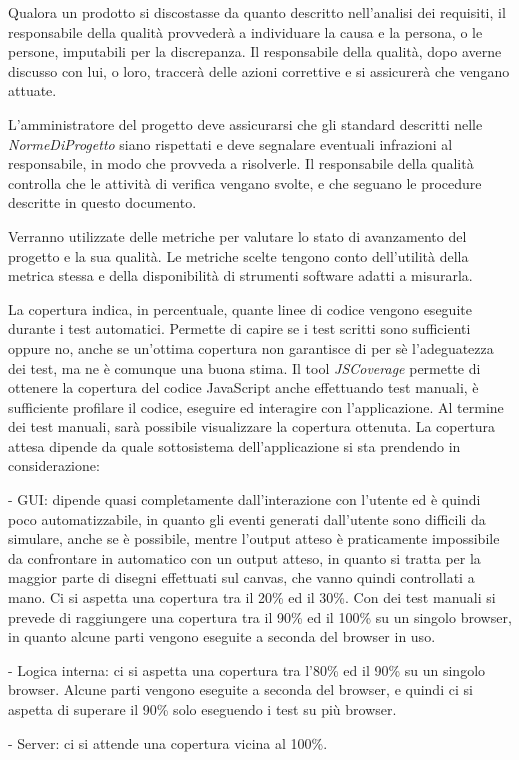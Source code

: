 Qualora un prodotto si discostasse da quanto descritto nell'analisi dei requisiti, il responsabile della qualit\`a provveder\`a a individuare la causa e la persona, o le persone, imputabili per la discrepanza. Il responsabile della qualit\`a, dopo averne discusso con lui, o loro, traccer\`a delle azioni correttive e si assicurer\`a che vengano attuate.
 
L'amministratore del progetto deve assicurarsi che gli standard descritti nelle \textit{NormeDiProgetto} siano rispettati e deve segnalare eventuali infrazioni al responsabile, in modo che provveda a risolverle. Il responsabile della qualit\`a controlla che le attivit\`a di verifica vengano svolte, e che seguano le procedure descritte in questo documento.
\newpage
 

Verranno utilizzate delle metriche per valutare lo stato di avanzamento del progetto e la sua qualit\`a. 
Le metriche scelte tengono conto dell'utilit\`a della metrica stessa e della disponibilit\`a di strumenti software
adatti a misurarla.

La copertura indica, in percentuale, quante linee di codice vengono eseguite durante i test automatici. Permette di capire se i test scritti sono sufficienti oppure no, anche se un'ottima copertura non garantisce di per s\`e l'adeguatezza dei test, ma ne \`e comunque una buona stima. Il tool \textit{JSCoverage} permette di ottenere la copertura del codice JavaScript anche effettuando test manuali, \`e sufficiente profilare il codice, eseguire ed interagire con l'applicazione. Al termine dei test manuali, sar\`a possibile visualizzare la copertura ottenuta. La copertura attesa dipende da quale sottosistema dell'applicazione si sta prendendo in considerazione:
\begin{elencopuntato}[\subsecindent]
\item[-] GUI: dipende quasi completamente dall'interazione con l'utente ed \`e quindi poco automatizzabile, in quanto gli eventi generati dall'utente sono difficili da simulare, anche se \`e possibile, mentre l'output atteso \`e praticamente impossibile da confrontare in automatico con un output atteso, in quanto si tratta per la maggior parte di disegni effettuati sul canvas, che vanno quindi controllati a mano. Ci si aspetta una copertura tra il 20\% ed il 30\%. Con dei test manuali si prevede di raggiungere una copertura tra il 90\% ed il 100\% su un singolo browser, in quanto alcune parti vengono eseguite a seconda del browser in uso.
\item[-] Logica interna: ci si aspetta una copertura tra l'80\% ed il 90\% su un singolo browser. Alcune parti vengono eseguite a seconda del browser, e quindi ci si aspetta di superare il 90\% solo eseguendo i test su pi\`u browser.
\item[-] Server: ci si attende una copertura vicina al 100\%.
\end{elencopuntato}

